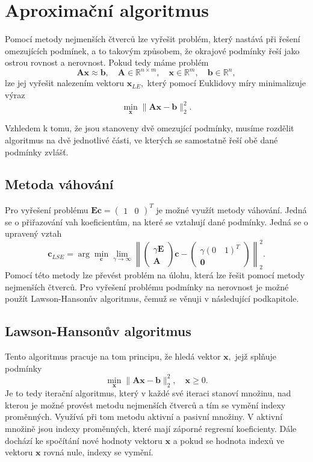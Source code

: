 \section{Aproximační algoritmus}
Pomocí metody nejmenších čtverc\r u \cite{bjork} lze vyřešit problém, který nastává při řešení omezujících podmínek, a to takovým zp\r usobem, že okrajové podmínky řeší jako ostrou rovnost a nerovnost.
Pokud tedy máme problém $$\mathbf{Ax}\approx\mathbf{b},\quad \mathbf{A}\in\mathbb{R}^{n\times m},
  \quad\mathbf{x}\in\mathbb{R}^{m},\quad\mathbf{b}\in\mathbb{R}^{n},$$
  lze jej vyřešit nalezením vektoru $\mathbf{x}_{LE},$ který pomocí Euklidovy míry minimalizuje výraz $$\min_{\mathbf{x}}\|\mathbf{Ax}-\mathbf{b}\|_2^2.$$
  
Vzhledem k tomu, že jsou stanoveny dvě omezující podmínky, musíme rozdělit algoritmus na dvě jednotlivé části, ve kterých se samostatně řeší obě dané podmínky zvláš\v t.

\subsection{Metoda váhování}
Pro vyřešení problému $\mathbf{Ec} = \begin{pmatrix} 1 & 0 \end{pmatrix}^T$ je možné využít metody váhování. Jedná se o přiřazování vah koeficient\r um, na které se vztahují dané podmínky. Jedná se o upravený vztah \cite{bjork} $$\mathbf{c}_{LSE} = \arg\min_{\mathbf{c}}\lim_{\gamma\rightarrow\infty}\left\|\begin{pmatrix} \gamma\mathbf{E} \\ \mathbf{A} 
  \end{pmatrix}\mathbf{c} - \begin{pmatrix} \gamma (0\quad1)^T \\ \mathbf{0} \end{pmatrix}\right\|_2^2.$$
Pomocí této metody lze převést problém na \' ulohu, která lze řešit pomocí metody nejmenších čtverc\r u. Pro vyřešení problému podmínky na nerovnost je možné použít Lawson-Hanson\r uv algoritmus, čemuž se věnuji v následující podkapitole.
\subsection{Lawson-Hanson\r uv algoritmus}

Tento algoritmus \cite{chen} pracuje na tom principu, že hledá vektor $\mathbf{x},$ jejž spl\v nuje podmínky $$\min_{\mathbf{x}}\|\mathbf{Ax}-\mathbf{b}\|_2^2,\quad\mathbf{x} \geq 0.$$
Je to tedy iterační algoritmus, který v každé své iteraci stanoví množinu, nad kterou je možné provést metodu nejmenších čtverc\r u a tím se vymění indexy proměnných. Využívá při tom metodu aktivní a pasivní množiny. V aktivní množině jsou indexy proměnných, které mají záporné regresní koeficienty. Dále dochází ke spočítání nové hodnoty vektoru $\mathbf{x}$ a pokud se hodnota index\r u ve vektoru $\mathbf{x}$ rovná nule, indexy se vymění.


